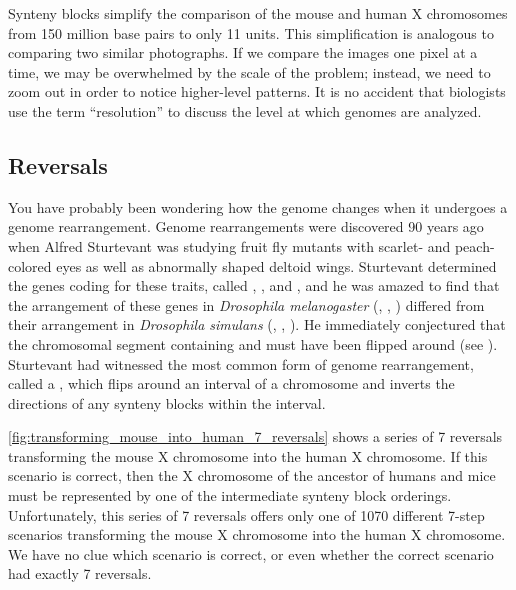 Synteny blocks simplify the comparison of the mouse and human X chromosomes from 150 million base pairs to only 11 units. This simplification is analogous to comparing two similar photographs. If we compare the images one pixel at a time, we may be overwhelmed by the scale of the problem; instead, we need to zoom out in order to notice higher-level patterns.  It is no accident that biologists use the term ``resolution'' to discuss the level at which genomes are analyzed.

\subsection{Reversals}
\label{subsec:reversals}

You have probably been wondering how the genome changes when it undergoes a genome rearrangement. Genome rearrangements were discovered 90 years ago when Alfred Sturtevant was studying fruit fly mutants with scarlet- and peach-colored eyes as well as abnormally shaped deltoid wings. Sturtevant determined the genes coding for these traits, called , , and , and he was amazed to find that the arrangement of these genes in \textit{Drosophila melanogaster} (, , ) differed from their arrangement in \textit{Drosophila simulans} (, , ). He immediately conjectured that the chromosomal segment containing  and  must have been flipped around (see ). Sturtevant had witnessed the most common form of genome rearrangement, called a , which flips around an interval of a chromosome and inverts the directions of any synteny blocks within the interval.

\autoref{fig:transforming_mouse_into_human_7_reversals} shows a series of 7 reversals transforming the mouse X chromosome into the human X chromosome.  If this scenario is correct, then the X chromosome of the ancestor of humans and mice must be represented by one of the intermediate synteny block orderings.  Unfortunately, this series of 7 reversals offers only one of 1070 different 7-step scenarios transforming the mouse X chromosome into the human X chromosome. We have no clue which scenario is correct, or even whether the correct scenario had exactly 7 reversals.\\

\begin{qbox}\end{qbox}

